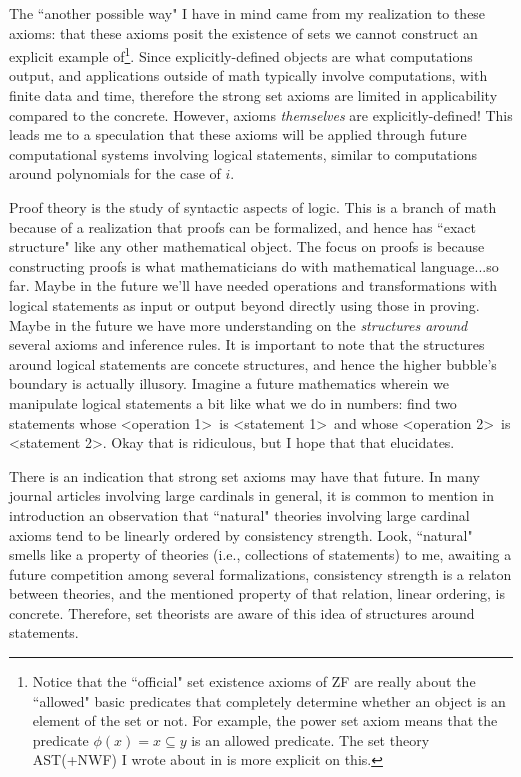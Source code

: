 \documentclass{article}
\theoremstyle{plain}
\begin{document}
The ``another possible way" I have in mind came from my realization to these axioms: that these axioms posit the existence of sets we cannot construct an explicit example of\footnote{Notice that the ``official" set existence axioms of \textsf{ZF} are really about the ``allowed" basic predicates that completely determine whether an object is an element of the set or not. For example, the power set axiom means that the predicate $\phi(x) = x \subseteq y$ is an allowed predicate. The set theory \textsf{AST(+NWF)} I wrote about in \cite{astnwf} is more explicit on this.}. Since explicitly-defined objects are what computations output, and applications outside of math typically involve computations, with finite data and time, therefore the strong set axioms are limited in applicability compared to the concrete. However, axioms \textit{themselves} are explicitly-defined! This leads me to a speculation that these axioms will be applied through future computational systems involving logical statements, similar to computations around polynomials for the case of $i$.

Proof theory is the study of syntactic aspects of logic. This is a branch of math because of a realization that proofs can be formalized, and hence has ``exact structure" like any other mathematical object. The focus on proofs is because constructing proofs is what mathematicians do with mathematical language...so far. Maybe in the future we'll have needed operations and transformations with logical statements as input or output beyond directly using those in proving. Maybe in the future we have more understanding on the \textit{structures around} several axioms and inference rules. It is important to note that the structures around logical statements are concete structures, and hence the higher bubble's boundary is actually illusory. Imagine a future mathematics wherein we manipulate logical statements a bit like what we do in numbers: find two statements whose \textless operation 1\textgreater\ is \textless statement 1\textgreater\ and whose \textless operation 2\textgreater\ is \textless statement 2\textgreater. Okay that is ridiculous, but I hope that that elucidates.

There is an indication that strong set axioms may have that future. In many journal articles involving large cardinals in general, it is common to mention in introduction an observation that ``natural" theories involving large cardinal axioms tend to be linearly ordered by consistency strength\cite{hamkins2025}. Look, ``natural" smells like a property of theories (i.e., collections of statements) to me, awaiting a future competition among several formalizations, consistency strength is a relaton between theories, and the mentioned property of that relation, linear ordering, is concrete. Therefore, set theorists are aware of this idea of structures around statements.
\end{document}
